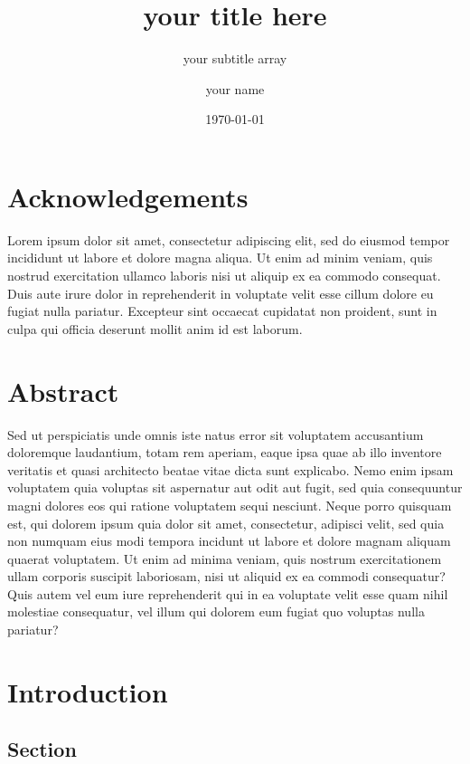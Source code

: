 \documentclass[12pt, twoside]{report}
\title{your title here}
\subtitle{your subtitle array}
\author{your name}
\date{\today}
\begin{document}
\pagestyle{empty}



\chapter*{Acknowledgements}
\noindent Lorem ipsum dolor sit amet, consectetur adipiscing elit, sed do eiusmod tempor incididunt ut labore et dolore magna aliqua. 
Ut enim ad minim veniam, quis nostrud exercitation ullamco laboris nisi ut aliquip ex ea commodo consequat. 
Duis aute irure dolor in reprehenderit in voluptate velit esse cillum dolore eu fugiat nulla pariatur. 
Excepteur sint occaecat cupidatat non proident, sunt in culpa qui officia deserunt mollit anim id est laborum.

\chapter*{Abstract}
\noindent Sed ut perspiciatis unde omnis iste natus error sit voluptatem accusantium doloremque laudantium, totam rem aperiam, 
eaque ipsa quae ab illo inventore veritatis et quasi architecto beatae vitae dicta sunt explicabo. 
Nemo enim ipsam voluptatem quia voluptas sit aspernatur aut odit aut fugit, sed quia consequuntur magni dolores eos qui ratione voluptatem sequi nesciunt. 
Neque porro quisquam est, qui dolorem ipsum quia dolor sit amet, consectetur, adipisci velit, sed quia non numquam eius modi tempora incidunt ut labore et dolore magnam aliquam 
quaerat voluptatem. Ut enim ad minima veniam, quis nostrum exercitationem ullam corporis suscipit laboriosam, nisi ut aliquid ex ea commodi consequatur? 
Quis autem vel eum iure reprehenderit qui in ea voluptate velit esse quam nihil molestiae consequatur, vel illum qui dolorem eum fugiat quo voluptas nulla pariatur?
\tableofcontents


\pagestyle{plain}

\chapter{Introduction}\label{chp:intro}

\section{Section}
\end{document}
